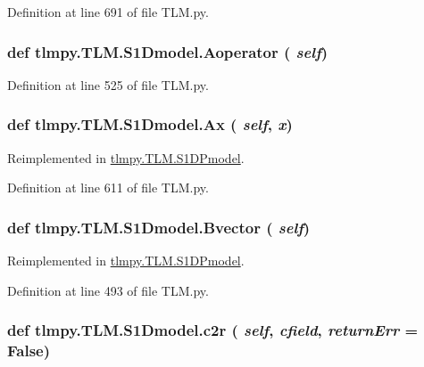 Definition at line 691 of file TLM.py.\hypertarget{classtlmpy_1_1TLM_1_1S1Dmodel_adfefbe2cae91d92b9ae5477468c6b434}{
\subsubsection[{Aoperator}]{\setlength{\rightskip}{0pt plus 5cm}def tlmpy.TLM.S1Dmodel.Aoperator ( {\em self})}}
\label{classtlmpy_1_1TLM_1_1S1Dmodel_adfefbe2cae91d92b9ae5477468c6b434}


Definition at line 525 of file TLM.py.\hypertarget{classtlmpy_1_1TLM_1_1S1Dmodel_a4fd10a343d5c4e2651f9a3f9a71b40aa}{
\subsubsection[{Ax}]{\setlength{\rightskip}{0pt plus 5cm}def tlmpy.TLM.S1Dmodel.Ax ( {\em self}, \/   {\em x})}}
\label{classtlmpy_1_1TLM_1_1S1Dmodel_a4fd10a343d5c4e2651f9a3f9a71b40aa}


Reimplemented in \hyperlink{classtlmpy_1_1TLM_1_1S1DPmodel_a8e8b79a90d45ff604294420a17bf1491}{tlmpy.TLM.S1DPmodel}.

Definition at line 611 of file TLM.py.\hypertarget{classtlmpy_1_1TLM_1_1S1Dmodel_aa8596d24bbf968f1b64281b3f8b96c1f}{
\subsubsection[{Bvector}]{\setlength{\rightskip}{0pt plus 5cm}def tlmpy.TLM.S1Dmodel.Bvector ( {\em self})}}
\label{classtlmpy_1_1TLM_1_1S1Dmodel_aa8596d24bbf968f1b64281b3f8b96c1f}


Reimplemented in \hyperlink{classtlmpy_1_1TLM_1_1S1DPmodel_ae99b5a939ef20edb55bfc019b8534f02}{tlmpy.TLM.S1DPmodel}.

Definition at line 493 of file TLM.py.\hypertarget{classtlmpy_1_1TLM_1_1S1Dmodel_ac8bae205258ae5031481a70f8f0aa305}{
\subsubsection[{c2r}]{\setlength{\rightskip}{0pt plus 5cm}def tlmpy.TLM.S1Dmodel.c2r ( {\em self}, \/   {\em cfield}, \/   {\em returnErr} = {\ttfamily False})}}
\label{classtlmpy_1_1TLM_1_1S1Dmodel_ac8bae205258ae5031481a70f8f0aa305}


